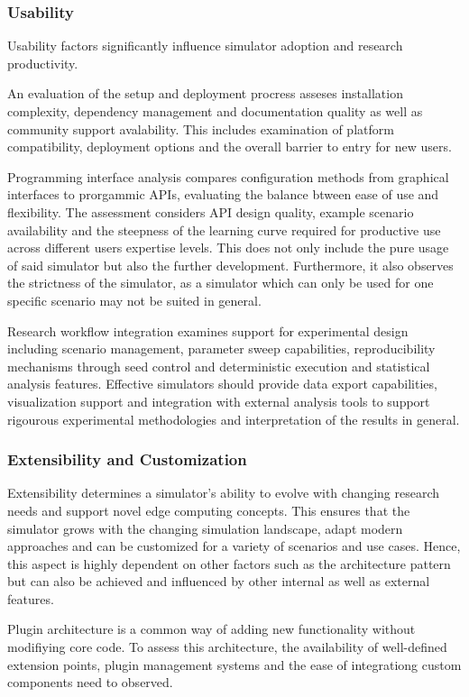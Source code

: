 \subsubsection{Usability}
Usability factors significantly influence simulator adoption and research productivity.

An evaluation of the setup and deployment procress asseses installation complexity, dependency management and documentation quality as well as community support avalability.
This includes examination of platform compatibility, deployment options and the overall barrier to entry for new users.

Programming interface analysis compares configuration methods from graphical interfaces to prorgammic APIs, evaluating the balance btween ease of use and flexibility.
The assessment considers API design quality, example scenario availability and the steepness of the learning curve required for productive use across different users expertise levels.
This does not only include the pure usage of said simulator but also the further development.
Furthermore, it also observes the strictness of the simulator, as a simulator which can only be used for one specific scenario may not be suited in general.

Research workflow integration examines support for experimental design including scenario management, parameter sweep capabilities, reproducibility mechanisms through seed control and deterministic execution and statistical analysis features.
Effective simulators should provide data export capabilities, visualization support and integration with external analysis tools to support rigourous experimental methodologies and interpretation of the results in general.

\subsubsection{Extensibility and Customization}
Extensibility determines a simulator's ability to evolve with changing research needs and support novel edge computing concepts.
This ensures that the simulator grows with the changing simulation landscape, adapt modern approaches and can be customized for a variety of scenarios and use cases.
Hence, this aspect is highly dependent on other factors such as the architecture pattern but can also be achieved and influenced by other internal as well as external features.

Plugin architecture is a common way of adding new functionality without modifiying core code.
To assess this architecture, the availability of well-defined extension points, plugin management systems and the ease of integrationg custom components need to observed.

